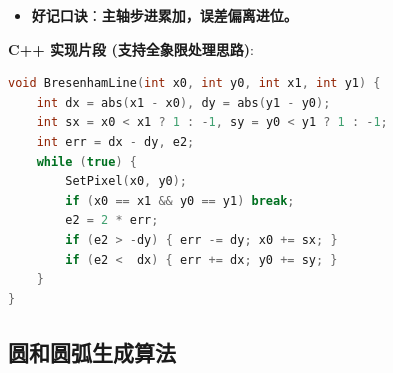 \documentclass[UTF8]{ctexart}
\begin{document}
\begin{itemize}
        \begin{itemize}
            \item \textbf{处理逻辑}：
                \begin{itemize}
                    \item 若 $|dx| < |dy|$（区域 2, 3, 6, 7）：交换 $x$ 和 $y$ 坐标计算，绘制时再交换回来。
                    \item 若 $x_0 > x_1$（区域 3, 4, 5, 6）：通过交换起点和终点，变换到 $y$ 轴右侧区域（区域 7, 8, 1, 2）。
                    \item 若斜率 $k < 0$（区域 7, 8）：对 $y$ 轴做镜像变换，计算完后再镜像回来。
                \end{itemize}
        \end{itemize}
    \item \textbf{好记口诀}：\textbf{主轴步进累加，误差偏离进位。}
\end{itemize}

\textbf{C++ 实现片段 (支持全象限处理思路)}:
\begin{lstlisting}[language=C++]
void BresenhamLine(int x0, int y0, int x1, int y1) {
    int dx = abs(x1 - x0), dy = abs(y1 - y0);
    int sx = x0 < x1 ? 1 : -1, sy = y0 < y1 ? 1 : -1;
    int err = dx - dy, e2;
    while (true) {
        SetPixel(x0, y0);
        if (x0 == x1 && y0 == y1) break;
        e2 = 2 * err;
        if (e2 > -dy) { err -= dy; x0 += sx; }
        if (e2 <  dx) { err += dx; y0 += sy; }
    }
}
\end{lstlisting}

\subsection{圆和圆弧生成算法}
\end{document}
